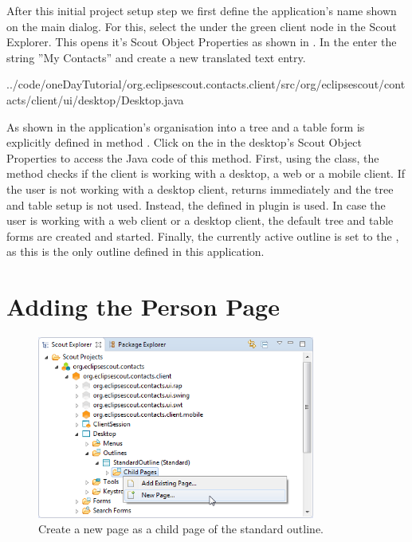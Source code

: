 \documentclass[a4paper,10pt,twoside]{book}
\begin{document}
After this initial project setup step we first define the application's name shown on the main dialog. 
For this, select the  under the green client node in the Scout Explorer.
This opens it's Scout Object Properties as shown in .
In the  enter the string ''My Contacts'' and create a new translated text entry.  


{../code/oneDayTutorial/org.eclipsescout.contacts.client/src/org/eclipsescout/contacts/client/ui/desktop/Desktop.java}

As shown in  the application's organisation into a tree and a table form is explicitly defined in method . 
Click on the  in the desktop's Scout Object Properties to access the Java code of this method.
First, using the  class, the method checks if the client is working with a desktop, a web or a mobile client. 
If the user is not working with a desktop client,  returns immediately and the tree and table setup is not used. 
Instead, the  defined in plugin  is used. 
In case the user is working with a web client or a desktop client, the default tree and table forms are created and started. 
Finally, the currently active outline is set to the , as this is the only outline defined in this application.

\section{Adding the Person Page}

\begin{figure}
\includegraphics[height=6cm]{new_page_person_contextmenu.png} 
\caption{Create a new page as a child page of the standard outline. }
\end{figure}
\end{document}
